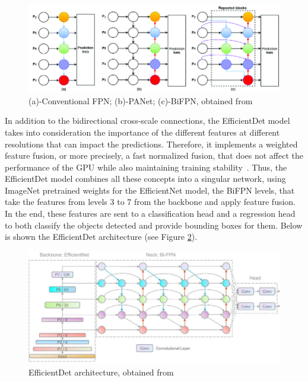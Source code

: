 \begin{figure}[!ht]
    \centering
    \includegraphics[width=1\textwidth]{figures/Figure6.png}
    \caption{(a)-Conventional FPN; (b)-PANet; (c)-BiFPN, obtained from ~\cite{link14}}
    \label{fig:fig6}
\end{figure}

In addition to the bidirectional cross-scale connections, the EfficientDet model takes into consideration the importance of the different features at different resolutions that can impact the predictions. Therefore, it implements a weighted feature fusion, or more precisely, a fast normalized fusion, that does not affect the performance of the GPU while also maintaining training stability~\cite{carte8}.
Thus, the EfficientDet model combines all these concepts into a singular network, using ImageNet pretrained weights for the EfficientNet model, the BiFPN levels, that take the features from levels 3 to 7 from the backbone and apply feature fusion. In the end, these features are sent to a classification head and a regression head to both classify the objects detected and provide bounding boxes for them. Below is shown the EfficientDet architecture (see Figure \ref{fig:fig7}).

\begin{figure}[!ht]
    \centering
    \includegraphics[width=1\textwidth]{figures/Figure7.jpg}
    \caption{EfficientDet architecture, obtained from ~\cite{link15}}
    \label{fig:fig7}
\end{figure}